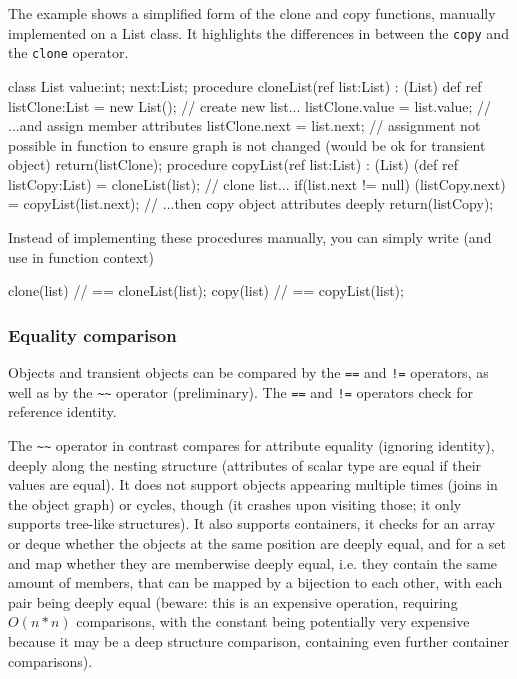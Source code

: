 \begin{example}
The example shows a simplified form of the clone and copy functions, manually implemented on a List class.
It highlights the differences in between the \texttt{copy} and the \texttt{clone} operator.
\begin{grgen}
class List {
  value:int;
  next:List;
}
procedure cloneList(ref list:List) : (List)
{
  def ref listClone:List = new List(); // create new list...
  listClone.value = list.value; // ...and assign member attributes
  listClone.next = list.next; // assignment not possible in function to ensure graph is not changed (would be ok for transient object)
  return(listClone);
}
procedure copyList(ref list:List) : (List)
{
  (def ref listCopy:List) = cloneList(list); // clone list...
  if(list.next != null) {
    (listCopy.next) = copyList(list.next); // ...then copy object attributes deeply
  } 
  return(listCopy);
}
\end{grgen}
Instead of implementing these procedures manually, you can simply write (and use in function context)
\begin{grgen}
clone(list) // == cloneList(list);
copy(list) // == copyList(list);
\end{grgen}
\end{example}


\subsubsection{Equality comparison}\label{subsec:objectequality}

Objects and transient objects can be compared by the \texttt{==} and \texttt{!=} operators, as well as by the \texttt{\textasciitilde\textasciitilde} operator (preliminary).
The \texttt{==} and \texttt{!=} operators check for reference identity.

The \texttt{\textasciitilde\textasciitilde} operator in contrast compares for attribute equality (ignoring identity), deeply along the nesting structure (attributes of scalar type are equal if their values are equal).
It does not support objects appearing multiple times (joins in the object graph) or cycles, though (it crashes upon visiting those; it only supports tree-like structures).
It also supports containers, it checks for an array or deque whether the objects at the same position are deeply equal, and for a set and map whether they are memberwise deeply equal, i.e. they contain the same amount of members, that can be mapped by a bijection to each other, with each pair being deeply equal
(beware: this is an expensive operation, requiring $O(n*n)$ comparisons, with the constant being potentially very expensive because it may be a deep structure comparison, containing even further container comparisons).

